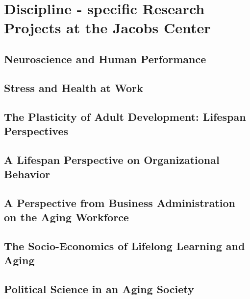 \section{Discipline - specific Research Projects at the Jacobs Center} 


\subsection{Neuroscience and Human Performance }


%

\subsection{ Stress and Health at Work}

%

\subsection{The Plasticity of Adult Development: Lifespan Perspectives}




\subsection{A Lifespan Perspective on Organizational Behavior}





\subsection{A Perspective from Business Administration on the Aging 	Workforce}




\subsection{The Socio-Economics of Lifelong Learning and Aging }




\subsection{Political Science in an Aging Society}




